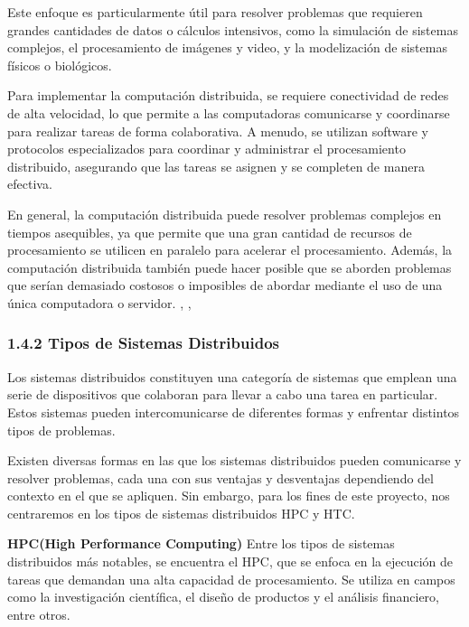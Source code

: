\begin{spacing}{1.5}
\begin{multicols}{2}
  Este enfoque es particularmente útil para resolver problemas que requieren grandes cantidades de datos o cálculos intensivos, como la simulación de sistemas complejos, el procesamiento de imágenes y video, y la modelización de sistemas físicos o biológicos.

  Para implementar la computación distribuida, se requiere conectividad de redes de alta velocidad, lo que permite a las computadoras comunicarse y coordinarse para realizar tareas de forma colaborativa. A menudo, se utilizan software y protocolos especializados para coordinar y administrar el procesamiento distribuido, asegurando que las tareas se asignen y se completen de manera efectiva.

  En general, la computación distribuida puede resolver problemas complejos en tiempos asequibles, ya que permite que una gran cantidad de recursos de procesamiento se utilicen en paralelo para acelerar el procesamiento. Además, la computación distribuida también puede hacer posible que se aborden problemas que serían demasiado costosos o imposibles de abordar mediante el uso de una única computadora o servidor. \cite{distributed-1}, \cite{distributed-4}, \cite{distributed-3}

  \subsubsection{1.4.2 Tipos de Sistemas Distribuidos}

  Los sistemas distribuidos constituyen una categoría de sistemas que emplean una serie de dispositivos que colaboran para llevar a cabo una tarea en particular. Estos sistemas pueden intercomunicarse de diferentes formas y enfrentar distintos tipos de problemas.

  Existen diversas formas en las que los sistemas distribuidos pueden comunicarse y resolver problemas, cada una con sus ventajas y desventajas dependiendo del contexto en el que se apliquen. Sin embargo, para los fines de este proyecto, nos centraremos en los tipos de sistemas distribuidos HPC y HTC.
  \vspace{3mm}

  \textbf{HPC(High Performance Computing)}  
  \newline
  Entre los tipos de sistemas distribuidos más notables, se encuentra el HPC, que se enfoca en la ejecución de tareas que demandan una alta capacidad de procesamiento. Se utiliza en campos como la investigación científica, el diseño de productos y el análisis financiero, entre otros.


\end{multicols}
\end{spacing}
